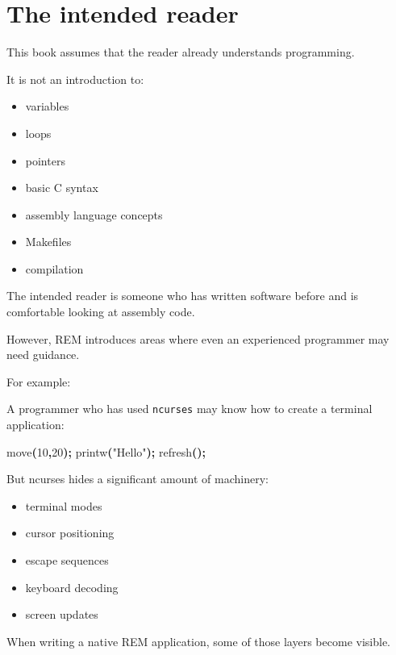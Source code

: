 \documentclass[
  oneside,
  openany]{book}
\newenvironment{Shaded}{\begin{snugshade}}{\end{snugshade}}
\newcommand{\DecValTok}[1]{\textcolor[rgb]{0.00,0.00,0.81}{#1}}
\newcommand{\NormalTok}[1]{#1}
\newcommand{\OperatorTok}[1]{\textcolor[rgb]{0.81,0.36,0.00}{\textbf{#1}}}
\newcommand{\StringTok}[1]{\textcolor[rgb]{0.31,0.60,0.02}{#1}}
\providecommand{\tightlist}{%
  \setlength{\itemsep}{0pt}\setlength{\parskip}{0pt}}
\begin{document}
\hypertarget{the-intended-reader}{%
\section{The intended reader}\label{the-intended-reader}}

This book assumes that the reader already understands programming.

It is not an introduction to:

\begin{itemize}
\tightlist
\item
  variables
\item
  loops
\item
  pointers
\item
  basic C syntax
\item
  assembly language concepts
\item
  Makefiles
\item
  compilation
\end{itemize}

The intended reader is someone who has written software before and is
comfortable looking at assembly code.

However, REM introduces areas where even an experienced programmer may
need guidance.

For example:

A programmer who has used \texttt{ncurses} may know how to create a
terminal application:

\begin{Shaded}
\begin{Highlighting}[]
\NormalTok{move}\OperatorTok{(}\DecValTok{10}\OperatorTok{,}\DecValTok{20}\OperatorTok{);}
\NormalTok{printw}\OperatorTok{(}\StringTok{"Hello"}\OperatorTok{);}
\NormalTok{refresh}\OperatorTok{();}
\end{Highlighting}
\end{Shaded}

But ncurses hides a significant amount of machinery:

\begin{itemize}
\tightlist
\item
  terminal modes
\item
  cursor positioning
\item
  escape sequences
\item
  keyboard decoding
\item
  screen updates
\end{itemize}

When writing a native REM application, some of those layers become
visible.
\end{document}
